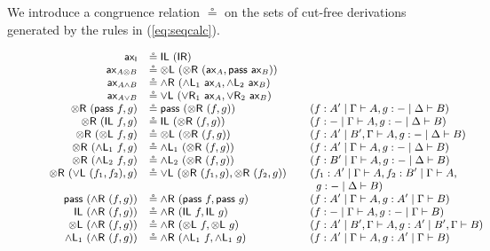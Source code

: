\documentclass[submission,copyright,creativecommons]{eptcs}
\theoremstyle{definition}
\newcommand{\tl}{\otimes \mathsf{L}}
\newcommand{\tr}{\otimes \mathsf{R}}
\newcommand{\pass}{\mathsf{pass}}
\newcommand{\unitl}{\mathsf{IL}}
\newcommand{\unitr}{\mathsf{IR}}
\newcommand{\andlone}{\land \mathsf{L}_{1}}
\newcommand{\andltwo}{\land \mathsf{L}_{2}}
\newcommand{\andr}{\land \mathsf{R}}
\newcommand{\orl}{\lor \mathsf{L}}
\newcommand{\orrone}{\lor \mathsf{R}_{1}}
\newcommand{\orrtwo}{\lor \mathsf{R}_{2}}
\newcommand{\ax}{\mathsf{ax}}
\newcommand{\ot}{\otimes}
\newcommand{\I}{\mathsf{I}}
\begin{document}
We introduce a congruence relation $\circeq$ on the sets of cut-free derivations generated by the rules in (\ref{eq:seqcalc}). 
\begin{figure}[t]
  \begin{equation}
  \label{fig:circeq}
  \small
  \begin{array}{rlll}
    \ax_{\I} &\circeq \unitl \text{ } (\unitr)
    \\
    \ax_{A \ot B} &\circeq \tl \text{ } (\tr \text{ } (\ax_{A} , \pass \text{ } \ax_{B}))
    \\
    \ax_{A \land B} &\circeq \andr \ (\andlone \ \ax_A , \andltwo \ \ax_B)
    \\
    \ax_{A \lor B} &\circeq \orl \ (\orrone \ \ax_A , \orrtwo \ \ax_B)
    \\
    \tr \text{ } (\pass \text{ } f, g) &\circeq \pass \text{ } (\tr \text{ } (f, g)) &&(f : A' \mid \Gamma \vdash A, g : {-} \mid \Delta \vdash B)
    \\
    \tr \text{ } (\unitl \text{ } f, g) &\circeq \unitl \text{ } (\tr \text{ } (f , g)) &&(f : {-} \mid \Gamma \vdash A , g : {-} \mid \Delta \vdash B)
    \\
    \tr \text{ } (\tl \text{ } f, g) &\circeq \tl \text{ } (\tr \text{ } (f , g)) &&(f : A' \mid B' , \Gamma \vdash A , g : {-} \mid \Delta \vdash B)
    \\
    \tr \ (\andlone \ f , g) &\circeq \andlone \ (\tr \ (f , g)) &&(f : A' \mid \Gamma \vdash A, g : - \mid \Delta \vdash B)
    \\
    \tr \ (\andltwo \ f , g) &\circeq \andltwo \ (\tr \ (f , g)) &&(f : B' \mid \Gamma \vdash A, g : - \mid \Delta \vdash B)
    \\
    \tr \ (\orl \ (f_1 , f_2) , g) &\circeq \orl \ (\tr \ (f_1 , g) , \tr \ (f_2 , g)) &&(f_1 : A' \mid \Gamma \vdash A , f_2 : B' \mid \Gamma \vdash A , \\
    & && \;\;g : - \mid \Delta \vdash B)
    \\
    \pass \ (\andr \ (f , g)) &\circeq  \andr \ (\pass \ f , \pass \ g) &&(f : A' \mid \Gamma \vdash A , g : A' \mid \Gamma \vdash B)
    \\
    \unitl \ (\andr \ (f , g)) &\circeq  \andr \ (\unitl \ f , \unitl \ g) &&(f : - \mid \Gamma \vdash A , g : - \mid \Gamma \vdash B)
    \\
    \tl \ (\andr \ (f , g)) &\circeq  \andr \ (\tl \ f , \tl \ g) &&(f : A' \mid B' , \Gamma \vdash A , g : A' \mid B' , \Gamma \vdash B)
    \\
    \andlone \ (\andr \ (f , g)) &\circeq  \andr \ (\andlone \ f , \andlone \ g) &&(f : A' \mid \Gamma \vdash A , g : A' \mid \Gamma \vdash B)

\end{array}
\end{equation}
\end{figure}
\end{document}

